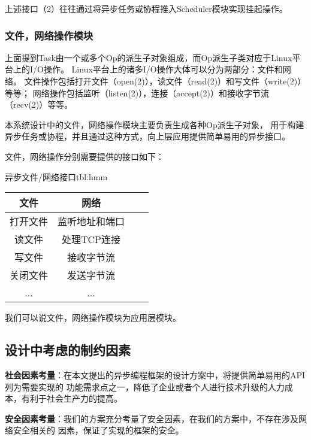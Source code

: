 \documentclass[supercite]{HustGraduPaper}
\theoremstyle{definition}
\begin{document}
上述接口（2）往往通过将异步任务或协程推入Scheduler模块实现挂起操作。\par

\subsubsection{文件，网络操作模块}

上面提到Task由一个或多个Op的派生子对象组成，而Op派生子类对应于Linux平台上的I/O操作。
Linux平台上的诸多I/O操作大体可以分为两部分：文件和网络。
文件操作包括打开文件（open(2)），读文件（read(2)）和写文件（write(2)）等等；
网络操作包括监听（listen(2)），连接（accept(2)）和接收字节流（recv(2)）等等。\par

本系统设计中的文件，网络操作模块主要负责生成各种Op派生子对象，
用于构建异步任务或协程，并且通过这种方式，向上层应用提供简单易用的异步接口。\par

文件，网络操作分别需要提供的接口如下：

\begin{generaltab}{异步文件/网络接口}{tbl:hmm}
  \begin{tabular}{c|ccc}
    \toprule
    文件 & 网络 \\
    \midrule
    打开文件 & 监听地址和端口 \\
    读文件 & 处理TCP连接 \\
    写文件 & 接收字节流 \\
    关闭文件 & 发送字节流 \\
    ... & ... \\
    \bottomrule
  \end{tabular}
\end{generaltab}

我们可以说文件，网络操作模块为应用层模块。\par

\subsection{设计中考虑的制约因素}

\textbf{社会因素考量}：在本文提出的异步编程框架的设计方案中，将提供简单易用的API列为需要实现的
功能需求点之一，降低了企业或者个人进行技术升级的人力成本，有利于社会生产力的提高。\par

\textbf{安全因素考量}：我们的方案充分考量了安全因素，在我们的方案中，不存在涉及网络安全相关的
因素，保证了实现的框架的安全。\par
\end{document}
